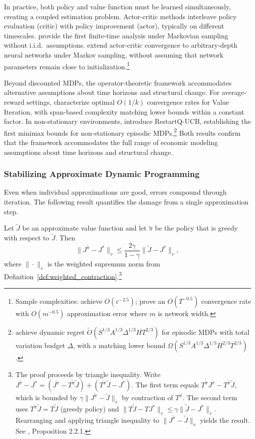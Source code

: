 In practice, both policy and value function must be learned simultaneously, creating a coupled estimation problem. Actor-critic methods interleave policy evaluation (critic) with policy improvement (actor), typically on different timescales. \citet{wu2020twotimescale} provide the first finite-time analysis under Markovian sampling without i.i.d.\ assumptions. \citet{tian2023} extend actor-critic convergence to arbitrary-depth neural networks under Markov sampling, without assuming that network parameters remain close to initialization.\footnote{Sample complexities: \citet{wu2020twotimescale} achieve $O(\varepsilon^{-2.5})$; \citet{tian2023} prove an $O(T^{-0.5})$ convergence rate with $O(m^{-0.5})$ approximation error where $m$ is network width.}

Beyond discounted MDPs, the operator-theoretic framework accommodates alternative assumptions about time horizons and structural change. For average-reward settings, \citet{lee2025optimal} characterize optimal $O(1/k)$ convergence rates for Value Iteration, with span-based complexity matching lower bounds within a constant factor. In non-stationary environments, \citet{mao2021nonstationary} introduce RestartQ-UCB, establishing the first minimax bounds for non-stationary episodic MDPs.\footnote{\citet{mao2021nonstationary} achieve dynamic regret $\tilde{O}(S^{1/3}A^{1/3}\Delta^{1/3}HT^{2/3})$ for episodic MDPs with total variation budget $\Delta$, with a matching lower bound $\Omega(S^{1/3}A^{1/3}\Delta^{1/3}H^{2/3}T^{2/3})$.} Both results confirm that the framework accommodates the full range of economic modeling assumptions about time horizons and structural change.

\subsubsection{Stabilizing Approximate Dynamic Programming}

Even when individual approximations are good, errors compound through iteration. The following result quantifies the damage from a single approximation step.

\begin{theorem}
\label{thm:one_step_lookahead}
Let $\tilde{J}$ be an approximate value function and let $\tilde{\pi}$ be the policy that is greedy with respect to $\tilde{J}$. Then
\[
\|J^{\tilde{\pi}} - J^*\|_v \leq \frac{2\gamma}{1-\gamma} \|\tilde{J} - J^*\|_v,
\]
where $\|\cdot\|_v$ is the weighted supremum norm from Definition~\ref{def:weighted_contraction}.\footnote{The proof proceeds by triangle inequality. Write $J^{\tilde{\pi}} - J^* = (J^{\tilde{\pi}} - T^{\tilde{\pi}}\tilde{J}) + (T^{\tilde{\pi}}\tilde{J} - J^*)$. The first term equals $T^{\tilde{\pi}}J^{\tilde{\pi}} - T^{\tilde{\pi}}\tilde{J}$, which is bounded by $\gamma\|J^{\tilde{\pi}} - \tilde{J}\|_v$ by contraction of $T^{\tilde{\pi}}$. The second term uses $T^{\tilde{\pi}}\tilde{J} = T\tilde{J}$ (greedy policy) and $\|T\tilde{J} - TJ^*\|_v \leq \gamma\|\tilde{J} - J^*\|_v$. Rearranging and applying triangle inequality to $\|J^{\tilde{\pi}} - \tilde{J}\|_v$ yields the result. See \citet{bertsekas2022}, Proposition 2.2.1.}
\end{theorem}

